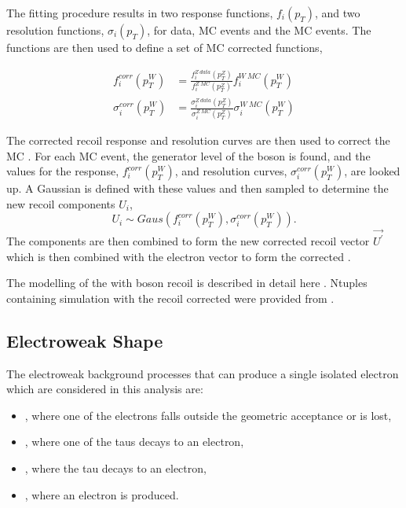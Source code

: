 The fitting procedure results in two response functions, $f_i(p_T)$, and two
resolution functions, $\sigma_i(p_T)$, for \PZ data, \PZ MC events and
the \PW MC events. The functions are then used to define a set of \PW
MC corrected functions, 

\begin{align}
f^{corr}_i (p^{W}_T)      
  &= \frac{ f^{Z\ data}_i (p^{Z}_T) }
          { f^{Z\ MC}_i (p^{Z}_T) }
          f^{W\ MC}_i (p^{W}_T) \\
\sigma^{corr}_i (p^{W}_T) 
  &= \frac{ \sigma^{Z\ data}_i (p^{Z}_T) }
          { \sigma^{Z\ MC}_i (p^{Z}_T) }
          \sigma^{W\ MC}_i (p^{W}_T) 
\end{align}

The corrected recoil response and resolution curves are then used to correct the
\PW MC \ETm. For each \PW MC event, the generator level \pT of the boson is
found, and the values for the response, $f^{corr}_i (p^{W}_T)$, and
resolution curves, $\sigma^{corr}_i (p^{W}_T) $, are looked up. A Gaussian is
defined with these values and then sampled to determine the new recoil
components $U_i$,
\begin{equation}
U_i \sim Gaus(f^{corr}_i (p^{W}_T), \sigma^{corr}_i (p^{W}_T) ).
\end{equation}
The components are then combined to form the new corrected recoil vector
$\vec{U^{\prime}}$ which is then combined with the electron vector to
form the corrected \ETm\cite{bauer2010modeling}.

The modelling of the \HepProcess{\PW\to\Plepton\Pnu} \ETm with boson recoil is
described in detail here \cite{bauer2010modeling}. 
Ntuples containing \HepProcess{\PW\to\Pelectron\Pnu} simulation with the recoil corrected \ETm were
provided from \cite{alcaraz2010updated}.

\subsection{{Electroweak} \ETm Shape}
The electroweak background processes that can produce a single isolated
electron which are considered in this analysis are:
\begin{itemize}
\item \HepProcess{\PZ\to\Pelectron\APelectron}, where one of the electrons falls
outside the geometric acceptance or is lost,
\item \HepProcess{\PZ\to\Ptauon\APtauon}, where one of the taus decays
to an electron,
\item \HepProcess{\PW\to\Ptau\Pnu}, where the tau decays to an electron,
\item \HepProcess{\Ptop\APtop}, where an electron is produced.
\end{itemize}

